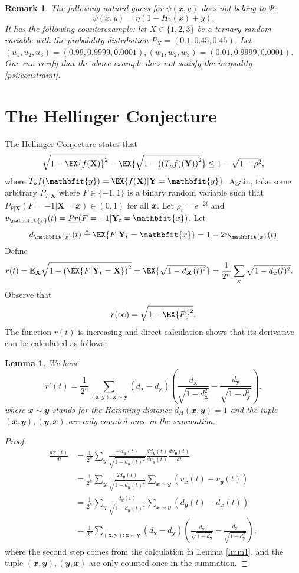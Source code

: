 \documentclass[conference,letterpaper,onecolumn]{IEEEtran}
\theoremstyle{plain}%
\newtheorem{lemma}[thm]{Lemma}
\newtheorem{rem}{Remark}
\newcommand{\bY}{\mathbf{Y}}
\newcommand{\by}{\mathbfit{y}}
\newcommand{\bX}{\mathbf{X}}
\newcommand{\bx}{\mathbfit{x}}
\begin{document}
\begin{rem}
    The following natural guess for $\psi(x,y)$ does not belong to $\Psi$:
$$\psi(x,y)=\eta(1-H_2(x)+y).$$
It has the following counterexample:
let $X\in\{1,2,3\}$ be a ternary random variable with the probability distribution $P_X = (0.1,0.45,0.45)$. Let $(u_1,u_2,u_3) = (0.99,0.9999,0.0001), (w_1, w_2, w_3) = (0.01,0.9999,0.0001)$. One can verify that the above example does not satisfy the inequality \eqref{psi:constraint}.
\end{rem}

\section{The Hellinger Conjecture}\label{sec3}
The Hellinger Conjecture states that
\begin{equation}
    \sqrt{1 - \EX{f(\bX)}^2} - \EX{\sqrt{1 - \left((T_\rho f)(\mathbf{Y})\right)^2}} \leq 1 - \sqrt{1 - \rho^2},
    \end{equation}
    where $T_\rho f(\by)=\EX{f(\bX) | \mathbf{Y}=\by}$. Again, take some arbitrary $P_{F|\bX}$ where $F\in \{-1,1\}$ is a binary random variable such that $P_{F|\bX}(F=-1|\bX=\bx)\in(0,1)$ for all $\bx$. 
Let $\rho_t=e^{-2t}$ and $v_{\bx}(t) = \emph{Pr}(F = -1|\bY_t = \bx)$. Let
$$d_{\bx}(t)\triangleq \EX{F| \mathbf{Y}_t=\bx}=1-2v_{\bx}(t)$$
Define
\begin{align*}
r(t)&=\mathbb{E}_{\bX}{\sqrt{1 - \left(\EX{F| \mathbf{Y}_t=\bX}\right)^2}}=\EX{\sqrt{1-d_{\bm{X}}(t)^2}} =\frac{1}{2^n}\sum_{\bm{x}}\sqrt{1-d_{\bm{x}}(t)^2}.
\end{align*}
Observe that $$r(\infty)=\sqrt{1 - \EX{F}^2}.$$
The function $r(t)$ is increasing and direct calculation shows that its derivative can be calculated as follows:
\begin{lemma}
    We have
    $$r'(t)=\frac{1}{2^{n}} \sum_{(\bm{x},\bm{y}): \bm{x} \sim \bm{y}} (d_{\bm{x}} - d_{\bm{y}})\left(\frac{d_{\bm{x}}}{\sqrt{1-d_{\bm{x}}^2}} - \frac{d_{\bm{y}}}{\sqrt{1-d_{\bm{y}}^2}} \right) .$$
where $\bx\sim \by$ stands for the Hamming distance $d_H(\bx,\by) = 1$ and the tuple $(\bx,\by),(\by,\bx)$ are only counted once in the summation.
\end{lemma}
\begin{proof}
    \begin{align*}
        \frac{d\gamma(t)}{dt} &= \frac{1}{2^n}\sum_\by \frac{-d_\by(t)}{\sqrt{1 - d_\by(t)^2}} \frac{d d_\by(t)}{dv_\by(t)}\frac{dv_\by(t)}{dt}\\
        &= \frac{1}{2^n}\sum_\by \frac{2d_\by(t)}{\sqrt{1 - d_\by(t)^2}}\sum_{\bx\sim\by}(v_\bx(t) - v_\by(t))\\
        &= \frac{1}{2^n}\sum_\by \frac{d_\by(t)}{\sqrt{1 - d_\by(t)^2}}\sum_{\bx \sim \by}(d_\by(t) - d_\bx(t))\\
        &= \frac{1}{2^{n}} \sum_{(\bm{x},\bm{y}): \bm{x} \sim \bm{y}} (d_{\bm{x}} - d_{\bm{y}})\left(\frac{d_{\bm{x}}}{\sqrt{1-d_{\bm{x}}^2}} - \frac{d_{\bm{y}}}{\sqrt{1-d_{\bm{y}}^2}} \right),
    \end{align*}
    where the second step comes from the calculation in Lemma \ref{lmm1}, and the tuple $(\bx,\by),(\by,\bx)$ are only counted once in the summation.
\end{proof}
\end{document}
